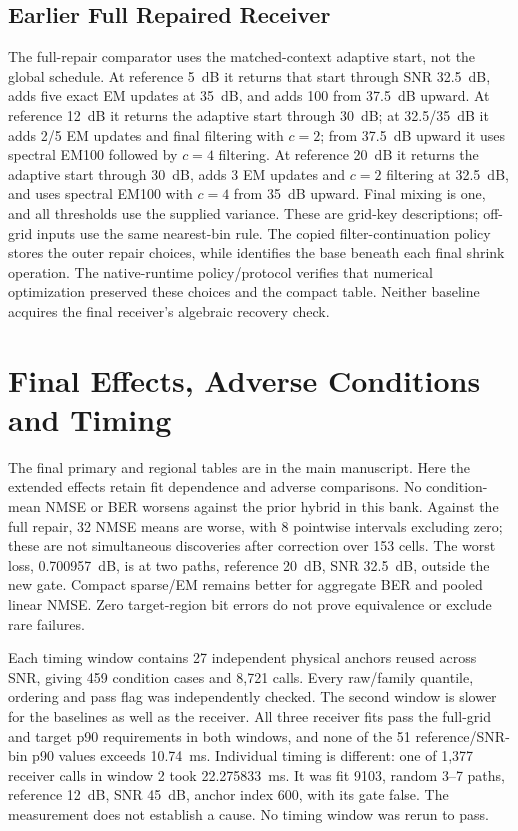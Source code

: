 \subsection{Earlier Full Repaired Receiver}
The full-repair comparator uses the matched-context adaptive start, not the global schedule. At reference 5~dB it returns that start through SNR 32.5~dB, adds five exact EM updates at 35~dB, and adds 100 from 37.5~dB upward. At reference 12~dB it returns the adaptive start through 30~dB; at 32.5/35~dB it adds 2/5 EM updates and final filtering with $c=2$; from 37.5~dB upward it uses spectral EM100 followed by $c=4$ filtering. At reference 20~dB it returns the adaptive start through 30~dB, adds 3 EM updates and $c=2$ filtering at 32.5~dB, and uses spectral EM100 with $c=4$ from 35~dB upward. Final mixing is one, and all thresholds use the supplied variance. These are grid-key descriptions; off-grid inputs use the same nearest-bin rule. The copied filter-continuation policy stores the outer repair choices, while  identifies the base beneath each final shrink operation. The native-runtime policy/protocol verifies that numerical optimization preserved these choices and the compact table. Neither baseline acquires the final receiver's algebraic recovery check.

\section{Final Effects, Adverse Conditions and Timing}

The final primary and regional tables are in the main manuscript. Here the extended effects retain fit dependence and adverse comparisons. No condition-mean NMSE or BER worsens against the prior hybrid in this bank. Against the full repair, 32 NMSE means are worse, with 8 pointwise intervals excluding zero; these are not simultaneous discoveries after correction over 153 cells. The worst loss, 0.700957~dB, is at two paths, reference 20~dB, SNR 32.5~dB, outside the new gate. Compact sparse/EM remains better for aggregate BER and pooled linear NMSE. Zero target-region bit errors do not prove equivalence or exclude rare failures.

Each timing window contains 27 independent physical anchors reused across SNR, giving 459 condition cases and 8,721 calls. Every raw/family quantile, ordering and pass flag was independently checked. The second window is slower for the baselines as well as the receiver. All three receiver fits pass the full-grid and target p90 requirements in both windows, and none of the 51 reference/SNR-bin p90 values exceeds 10.74~ms. Individual timing is different: one of 1,377 receiver calls in window 2 took 22.275833~ms. It was fit 9103, random 3--7 paths, reference 12~dB, SNR 45~dB, anchor index 600, with its gate false. The measurement does not establish a cause. No timing window was rerun to pass.

